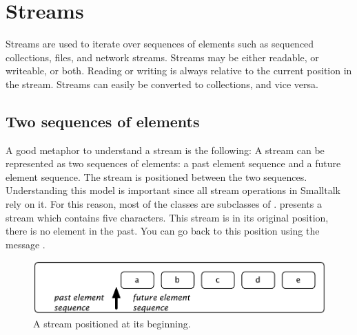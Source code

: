 \documentclass[a4paper,10pt,twoside]{book}
\begin{document}
	\sloppy
\fi
\chapter{Streams}


Streams are used to iterate over sequences of elements such as sequenced
collections, files, and network streams.
Streams may be either readable, or writeable, or both.
Reading or writing is always relative to the current position in the stream.
Streams can easily be converted to collections, and vice versa.

\section{Two sequences of elements}
A good metaphor to understand a stream is the following: A stream
can be represented as two sequences of elements: a past element sequence
and a future element sequence. The stream is positioned between the two
sequences. Understanding this model is important since all stream
operations in Smalltalk rely on it.
For this reason, most of the  classes are subclasses of .
 presents a stream which contains five characters. This stream is in its original position, \ie there is no element in the past. You can go back to this position using the message .

\begin{figure}[ht]
\centerline{\includegraphics[scale=0.5]{_abcdeStef}}
\caption{A stream positioned at its beginning.}
\vspace{.2in}
\end{figure}
\end{document}
